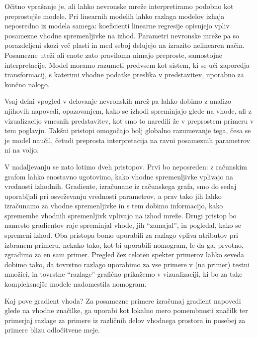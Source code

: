 %
%
Očitno vprašanje je, ali lahko nevronske mreže interpretiramo podobno kot preprostejše modele. Pri linearnih modelih lahko razlaga modelov izhaja neposredno iz modela samega: koeficienti linearne regresije opisujejo vpliv posamezne vhodne spremenljivke na izhod. Parametri nevronske mreže pa so porazdeljeni skozi več plasti in med seboj delujejo na izrazito nelinearen način. Posamezne uteži ali enote zato praviloma nimajo preproste, samostojne interpretacije. Model moramo razumeti predvsem kot sistem, ki se uči zaporedja transformacij, s katerimi vhodne podatke preslika v predstavitev, uporabno za končno nalogo.

Vsaj delni vpogled v delovanje nevronskih mrež pa lahko dobimo z analizo njihovih napovedi, opazovanjem, kako se izhodi spreminjajo glede na vhode, ali z vizualizacijo vmesnih predstavitev, kot smo to naredili že v preprostem primeru v tem poglavju. Takšni pristopi omogočajo bolj globalno razumevanje tega, česa se je model naučil, četudi preprosta interpretacija na ravni posameznih parametrov ni na voljo.

V nadaljevanju se zato lotimo dveh pristopov. Prvi bo neposreden: z računskim grafom lahko enostavno ugotovimo, kako vhodne spremenljivke vplivajo na vrednosti izhodnih. Gradiente, izračunane iz računskega grafa, smo do sedaj uporabljali pri osveževanju vrednosti parametrov, a prav tako jih lahko izračunamo za vhodne spremenljivke in s tem dobimo informacijo, kako spremembe vhodnih spremenljivk vplivajo na izhod mreže. Drugi pristop bo namesto gradientov raje spreminjal vhode, jih ``zamajal'', in pogledal, kako se spremeni izhod. Oba pristopa bomo uporabili za razlago vpliva atributov pri izbranem primeru, nekako tako, kot bi uporabili nomogram, le da ga, prvotno, zgradimo za en sam primer. Pregled čez celoten spekter primerov lahko seveda dobimo tako, da tovrstno razlago uporabimo za vse primere v (na primer) testni množici, in tovrstne ``razlage'' grafično prikažemo v vizualizaciji, ki bo za take kompleksnejše modele nadomestila nomogram.

\begin{exercise}{Kaj pove gradient vhoda?}
Za posamezne primere izračunaj gradient napovedi glede na vhodne značilke, ga uporabi kot lokalno mero pomembnosti značilk ter primerjaj razlage za primere iz različnih delov vhodnega prostora in posebej za primere blizu odločitvene meje.
\end{exercise}

